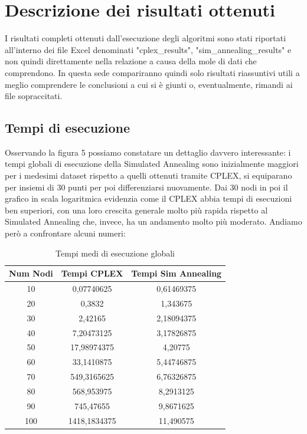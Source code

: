 \documentclass[preprint,12pt]{elsarticle}
\begin{document}
\section{Descrizione dei risultati ottenuti}
\label{S:4}

I risultati completi ottenuti dall'esecuzione degli algoritmi sono stati riportati all'interno dei file Excel denominati "cplex\_results", "sim\_annealing\_results" e non quindi direttamente nella relazione a causa della mole di dati che comprendono. In questa sede compariranno quindi solo risultati riassuntivi utili a meglio comprendere le conclusioni a cui si è giunti o, eventualmente, rimandi ai file sopraccitati. 

\subsection{\textbf{Tempi di esecuzione}}
Osservando la figura 5 possiamo constatare un dettaglio davvero interessante: i tempi globali di esecuzione della Simulated Annealing sono inizialmente maggiori per i medesimi dataset rispetto a quelli ottenuti tramite CPLEX, si equiparano per insiemi di 30 punti per poi differenziarsi nuovamente. Dai 30 nodi in poi il grafico in scala logaritmica evidenzia come il CPLEX abbia tempi di esecuzioni ben superiori, con una loro crescita generale molto più rapida rispetto al Simulated Annealing che, invece, ha un andamento molto più moderato. Andiamo però a confrontare alcuni numeri: 

\begin{table}[htbp]
\caption {Tempi medi di esecuzione globali} \label{tab:title} 
\begin{center}
\begin{tabular}{|c|c|c|}
\hline 
Num Nodi & Tempi CPLEX & Tempi Sim Annealing \\ 
\hline 
10 & 0,07740625
 & 0,61469375
 \\ 
\hline 
20 & 0,3832 & 1,343675 \\ 
\hline 
30 & 2,42165 & 2,18094375
 \\ 
\hline 
40 & 7,20473125
 & 3,17826875
 \\ 
\hline 
50 & 17,98974375
 & 4,20775
 \\ 
\hline 
60 & 33,1410875
 & 5,44746875
 \\ 
\hline 
70 & 549,3165625
 & 6,76326875
 \\ 
\hline 
80 & 568,953975
 & 8,2913125
 \\ 
\hline 
90 & 745,47655
 & 9,8671625
 \\ 
\hline 
100 & 1418,1834375
 & 11,490575
 \\ 
\hline 
\end{tabular} 
\end{center}
\end{table}
\end{document}
